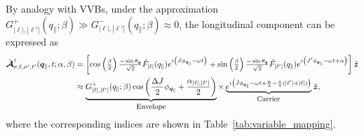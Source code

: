 \clearpage
By analogy with VVBs, under the approximation $G_{\left|\ell\right|,\left|\ell'\right|}^{+}(q_{\parallel}; \beta) \gg G_{\left|\ell\right|,\left|\ell'\right|}^{-}(q_{\parallel}; \beta)\approx0$, the longitudinal component can be expressed as
\leavevmode\vspace*{1em}
\begin{equation}
\begin{aligned}
\tilde{\boldsymbol{\mathcal{A}}}_{\sigma,\ell,\sigma',\ell'}^{z}(\boldsymbol{q}_{\|}, t; \alpha, \beta) 
&= \left[ \cos \left( \tfrac{\beta}{2} \right) \tfrac{-\sin \theta_{\boldsymbol{q}}}{\sqrt{2}} \tilde{F}_{|\ell|}(q_{\|}) e^{i\left( J\phi_{\boldsymbol{q}_{\|}} - \omega t \right)} + \sin \left( \tfrac{\beta}{2} \right) \tfrac{-\sin \theta_{\boldsymbol{q}}}{\sqrt{2}} \tilde{F}_{|\ell'|}(q_{\|}) e^{i\left( J'\phi_{\boldsymbol{q}_{\|}} - \omega t + \alpha \right)} \right] \hat{\boldsymbol{z}} \\
&\approx \underbrace{G_{|\ell|,|\ell'|}^{+}(q_{\|}; \beta) \cos \left( \frac{\Delta J}{2} \phi_{\boldsymbol{q}_{\|}} + \frac{\alpha_{|\ell|,|\ell'|}}{2} \right)}_{\text{\small Envelope}} \times \underbrace{e^{i\left( \bar{J}\phi_{\boldsymbol{q}_{\|}} - \omega t + \frac{\alpha}{2} - \frac{\pi}{4}(|\ell'|+|\ell|) \right)}}_{\text{\small Carrier}} \hat{\boldsymbol{z}},
\end{aligned}
\label{longitudinal}
\end{equation}
\leavevmode\vspace*{1em}
\noindent
where the corresponding indices are shown in Table~\ref{tab:variable_mapping}.

